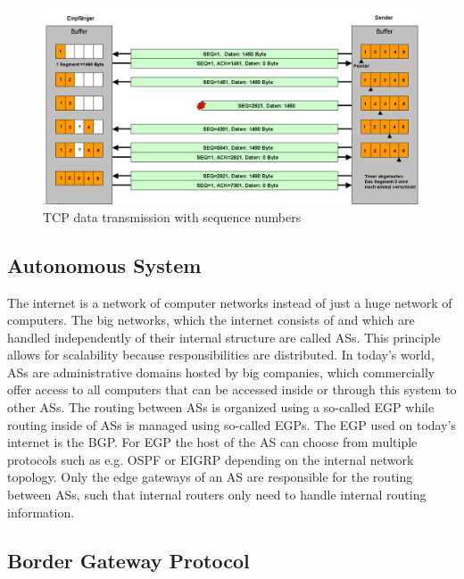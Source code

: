 \begin{figure}[h]
      \centering
      \includegraphics[width=\textwidth]{gfx/Tcp_transfer.png}
      \caption{TCP data transmission with sequence numbers}
      \label{fig:tcp_data_transmission}
\end{figure}

\subsection{Autonomous System}

The internet is a network of computer networks instead of just a huge network of computers. The big networks, which the internet consists of and which are handled independently of their internal structure are called \acp{AS}. This principle allows for scalability because responsibilities are distributed. In today's world, \acp{AS} are administrative domains hosted by big companies, which commercially offer access to all computers that can be accessed inside or through this system to other \acp{AS}. The routing between \acp{AS} is organized using a so-called \ac{EGP} while routing inside of \acp{AS} is managed using so-called \ac{EGP}s. The \ac{EGP} used on today's internet is the \ac{BGP}. For \ac{EGP} the host of the \ac{AS} can choose from multiple protocols such as e.g. \ac{OSPF} or \ac{EIGRP} depending on the internal network topology. Only the edge gateways of an \ac{AS} are responsible for the routing between \acp{AS}, such that internal routers only need to handle internal routing information.

\subsection{Border Gateway Protocol}

